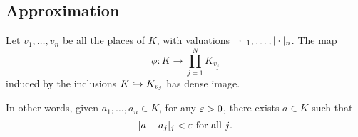 

\subsection{Approximation}
\begin{thm}%
Let $v_1,\ldots,v_n$ be all the places of $K$, with valuations $|\cdot|_1,\ldots, |\cdot|_n$.  
The map
\[
\phi:K\to \prod_{j=1}^N K_{v_j}
\]
induced by the inclusions $K\hookrightarrow K_{v_j}$ 
has dense image.

In other words, given $a_1,\ldots, a_n\in K$, for any $\varepsilon>0$, there exists $a\in K$ such that 
\[
|a-a_j|_j<\varepsilon\text{ for all $j$}.
\]
\end{thm}
